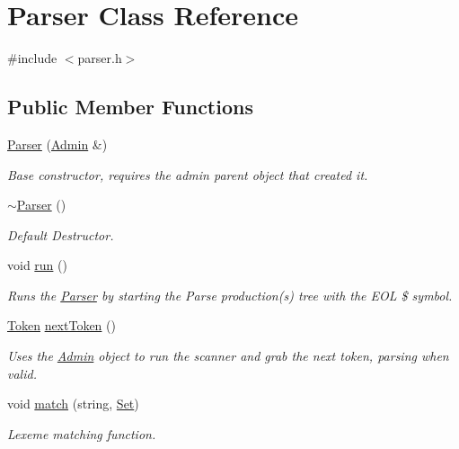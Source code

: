 \hypertarget{classParser}{
\section{Parser Class Reference}
\label{classParser}
}


{\ttfamily \#include $<$parser.h$>$}

\subsection*{Public Member Functions}
\begin{DoxyCompactItemize}
\item 
\hyperlink{classParser_a16503336f00dfa74eedd0ad3092d2c05}{Parser} (\hyperlink{classAdmin}{Admin} \&)
\begin{DoxyCompactList}\small\item\em Base constructor, requires the admin parent object that created it. \item\end{DoxyCompactList}\item 
\hyperlink{classParser_a3e658b5917a93a3ef648050d060e3a93}{$\sim$Parser} ()
\begin{DoxyCompactList}\small\item\em Default Destructor. \item\end{DoxyCompactList}\item 
void \hyperlink{classParser_a9e8d06d145f534e73a40b38e3f6711a0}{run} ()
\begin{DoxyCompactList}\small\item\em Runs the \hyperlink{classParser}{Parser} by starting the Parse production(s) tree with the EOL \$ symbol. \item\end{DoxyCompactList}\item 
\hyperlink{classToken}{Token} \hyperlink{classParser_ab53c98f6ae7ca5a9a48a1eec75fb52bc}{nextToken} ()
\begin{DoxyCompactList}\small\item\em Uses the \hyperlink{classAdmin}{Admin} object to run the scanner and grab the next token, parsing when valid. \item\end{DoxyCompactList}\item 
void \hyperlink{classParser_afd75ba38a886da3930c4a29f5d353a62}{match} (string, \hyperlink{classSet}{Set})
\begin{DoxyCompactList}\small\item\em Lexeme matching function. \item\end{DoxyCompactList}\item 

\end{DoxyCompactItemize}
